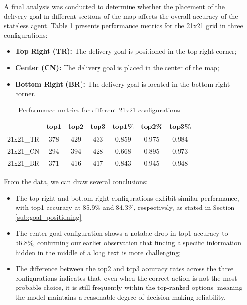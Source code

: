 A final analysis was conducted to determine whether the placement of the delivery
goal in different sections of the map affects the overall accuracy of the stateless
agent. Table \ref{tab:performance_21x21} presents performance metrics for the
21x21 grid in three configurations:
\begin{itemize}
  \item \textbf{Top Right (TR):} The delivery goal is positioned in the top-right
    corner;

  \item \textbf{Center (CN):} The delivery goal is placed in the center of the
    map;

  \item \textbf{Bottom Right (BR):} The delivery goal is located in the bottom-right
    corner.
\end{itemize}

\begin{table}[h]
  \centering
  \begin{tabular}{c|ccc|ccc}
              & top1 & top2 & top3 & top1\% & top2\% & top3\% \\
    \hline
    21x21\_TR & 378  & 429  & 433  & 0.859  & 0.975  & 0.984  \\
    21x21\_CN & 294  & 394  & 428  & 0.668  & 0.895  & 0.973  \\
    21x21\_BR & 371  & 416  & 417  & 0.843  & 0.945  & 0.948  \\
  \end{tabular}
  \caption{Performance metrics for different 21x21 configurations}
  \label{tab:performance_21x21}
\end{table}

From the data, we can draw several conclusions:
\begin{itemize}
  \item The top-right and bottom-right configurations exhibit similar performance,
    with top1 accuracy at 85.9\% and 84.3\%, respectively, as stated in Section
    \ref{sub:goal_positioning};

  \item The center goal configuration shows a notable drop in top1 accuracy to 66.8\%,
    confirming our earlier observation that finding a specific information hidden
    in the middle of a long text is more challenging;

  \item The difference between the top2 and top3 accuracy rates across the three
    configurations indicates that, even when the correct action is not the most
    probable choice, it is still frequently within the top-ranked options,
    meaning the model maintains a reasonable degree of decision-making
    reliability.
\end{itemize}

